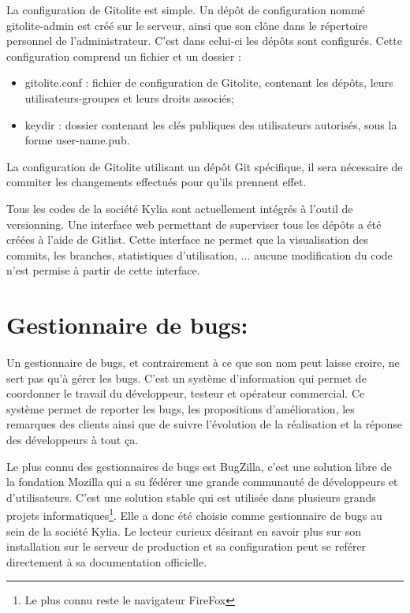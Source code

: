 \documentclass{themeensg}
\begin{document}
 La configuration de Gitolite est simple. Un dépôt de configuration nommé gitolite-admin est créé sur le serveur, ainsi que son clône dans le répertoire personnel de l'administrateur. C'est dans celui-ci les dépôts sont configurés. Cette configuration comprend un fichier et un dossier :
\begin{itemize}
\item gitolite.conf : fichier de configuration de Gitolite, contenant les dépôts, leurs utilisateurs-groupes et leurs droits associés;
\item keydir : dossier contenant les clés publiques des utilisateurs autorisés, sous la forme user-name.pub.
\end{itemize}

La configuration de Gitolite utilisant un dépôt Git spécifique, il sera nécessaire de commiter les changements effectués pour qu'ils prennent effet.

Tous les codes de la société Kylia sont actuellement intégrés à l'outil de versionning. Une interface web permettant de superviser tous les dépôts a été créées à l'aide de Gitlist. Cette interface ne permet que la visualisation des commits, les branches, statistiques d'utilisation, ... aucune modification du code n'est permise à partir de cette interface.

\section{Gestionnaire de bugs:}
Un gestionnaire de bugs, et contrairement à ce que son nom peut laisse croire, ne sert pas qu'à gérer les bugs. C'est un système d'information qui permet de coordonner le travail du développeur, testeur et opérateur commercial. Ce système permet de reporter les bugs, les propositions d'amélioration, les remarques des clients ainsi que de suivre l'évolution de la réalisation et la réponse des développeurs à tout ça.

Le plus connu des gestionnaires de bugs est BugZilla, c'est une solution libre de la fondation Mozilla qui a su fédérer une grande communauté de développeurs et d'utilisateurs. C'est une solution stable qui est utilisée dans plusieurs grands projets informatiques\footnote{Le plus connu reste le navigateur FireFox}. Elle a donc été choisie comme gestionnaire de bugs au sein de la société Kylia. Le lecteur curieux désirant en savoir plus sur son installation sur le serveur de production et sa configuration peut se reférer directement à sa documentation officielle.
\end{document}

